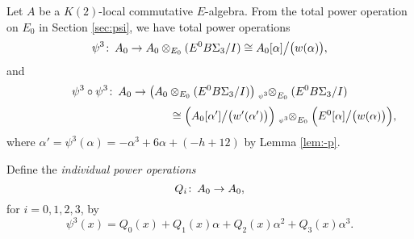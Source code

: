 \documentclass{gtpart}
\theoremstyle{definition}
\theoremstyle{remark}
\def\co{\colon\thinspace}
\newcommand{\A}{\alpha}
\newcommand{\p}{\psi^3}
\begin{document}
Let $A$ be a $K(2)$-local commutative $E$-algebra.  
From the total power operation on $E_0$ in Section \ref{sec:psi}, we have total power operations 
\[
 \p \co A_0 \to A_0 \otimes_{E_0} (E^0 B\Sigma_3 / I) \cong A_0 [\A] \big/ \big( w(\A) \big), 
\]
and 
\[
 \p \circ \p \co A_0 \to \big( A_0 \otimes_{E_0} (E^0 B\Sigma_3 / I) \big) \tensor[_{\scriptscriptstyle{\p}}]{\otimes}{_{E_0}} (E^0 B\Sigma_3 / I) 
\]
\[
 ~~~~~~~~~~~~~~~~~~~~~~~~~~~~~~~~~~~~~~~~\cong \Big( A_0 [\A'] \big/ \big( w'(\A') \big) \Big) \tensor[_{\scriptscriptstyle{\p}}]{\otimes}{_{E_0}} \Big( E^0 [\A] \big/ \big( w(\A) \big) \Big), 
\]
where $\A' = \p(\A) = -\A^3 + 6 \A + (-h + 12)$ by Lemma \ref{lem:-p}.  

Define the {\em individual power operations} 
\[
 Q_i \co A_0 \to A_0, 
\]
for $i = 0, 1, 2, 3$, by 
\[
 \p (x) = Q_0(x) + Q_1(x) \A + Q_2(x) \A^2 + Q_3(x) \A^3.  
\]
\end{document}
